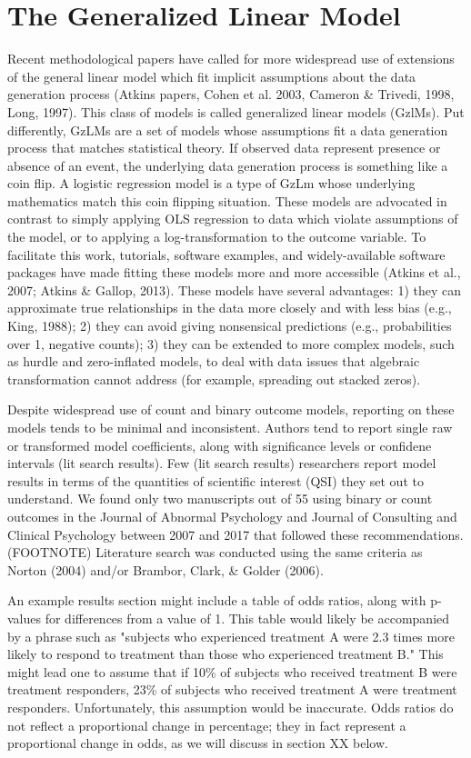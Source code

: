 \documentclass[jou, apacite]{apa6}
\begin{document}
\section{The Generalized Linear Model}

Recent methodological papers have called for more widespread use of extensions of the general linear model which fit implicit assumptions about the data generation process (Atkins papers, Cohen et al. 2003, Cameron & Trivedi, 1998, Long, 1997). 
This class of models is called generalized linear models (GzlMs).
Put differently, GzLMs are a set of models whose assumptions fit a data generation process that matches statistical theory.
If observed data represent presence or absence of an event, the underlying data generation process is something like a coin flip. 
A logistic regression model is a type of GzLm whose underlying mathematics match this coin flipping situation.
These models are advocated in contrast to simply applying OLS regression to data which violate assumptions of the model, or to applying a log-transformation to the outcome variable.
To facilitate this work, tutorials, software examples, and widely-available software packages have made fitting these models more and more accessible (Atkins et al., 2007; Atkins \& Gallop, 2013).
These models have several advantages: 1) they can approximate true relationships in the data more closely and with less bias (e.g., King, 1988); 2) they can avoid giving nonsensical predictions (e.g., probabilities over 1, negative counts); 3) they can be extended to more complex models, such as hurdle and zero-inflated models, to deal with data issues that algebraic transformation cannot address (for example, spreading out stacked zeros). 

Despite widespread use of count and binary outcome models, reporting on these models tends to be minimal and inconsistent. 
Authors tend to report single raw or transformed model coefficients, along with significance levels or confidene intervals (lit search results). 
Few (lit search results) researchers report model results in terms of the quantities of scientific interest (QSI) they set out to understand. 
We found only two manuscripts out of 55 using binary or count outcomes in the Journal of Abnormal Psychology and Journal of Consulting and Clinical Psychology between 2007 and 2017 that followed these recommendations. (FOOTNOTE) 
Literature search was conducted using the same criteria as Norton (2004) and/or Brambor, Clark, \& Golder (2006). 

An example results section might include a table of odds ratios, along with p-values for differences from a value of 1.
This table would likely be accompanied by a phrase such as "subjects who experienced treatment A were 2.3 times more likely to respond to treatment than those who experienced treatment B." 
This might lead one to assume that if 10\% of subjects who received treatment B were treatment responders, 23\% of subjects who received treatment A were treatment responders. 
Unfortunately, this assumption would be inaccurate.
Odds ratios do not reflect a proportional change in percentage; they in fact represent a proportional change in odds, as we will discuss in section XX below.
\end{document}
